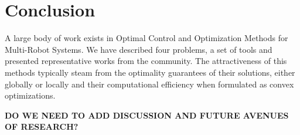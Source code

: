 
\section{Conclusion}\label{sec:5}

A large body of work exists in Optimal Control and Optimization Methods for Multi-Robot Systems. 
We have described four problems, a set of tools and presented representative works from the community.
The attractiveness of this methods typically steam from the optimality guarantees of their solutions, either globally or locally and their computational efficiency when formulated as convex optimizations.

\textbf{DO WE NEED TO ADD DISCUSSION AND FUTURE AVENUES OF RESEARCH?}